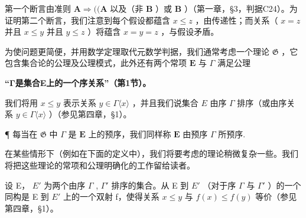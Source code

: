 第一个断言由准则 \(\mathbf{A} \Longrightarrow ((\mathbf{A}\) 以及（非 \(\mathbf{B}\) ）或 \(\mathbf{B}\) ）（第一章，§3，判据C24）。为证明第二个断言，我们注意到每个假设都蕴含 \(x \leqslant z\) ，由传递性；而关系（ \(x = z\) 并且 \(x \leqslant y\) 并且 \(y \leqslant z\) ）将蕴含 \(x = y = z\) ，与假设矛盾。

为使问题更简便，并用数学定理取代元数学判据，我们通常考虑一个理论 \(\mathfrak{G}\) ，它包含集合论的公理及公理模式，此外还有两个常项 \(\mathbf{E}\) 与 \(\Gamma\) 满足公理

\textbf{“Γ是集合E上的一个序关系”（第1节）。}

我们将用 \(x \leqslant y\) 表示关系 \(y \in \Gamma \langle x \rangle\) ，并且我们说集合 \(E\) 由序 \(\Gamma\) 排序（或由序关系 \(y \in \Gamma \langle x \rangle\) ）（参见第四章，§1）。

¶ 每当在 \(\mathfrak{G}\) 中 \(\Gamma\) 是 \(\mathbf{E}\) 上的预序，我们同样称 \(\mathbf{E}\) 由预序 \(\Gamma\) 所预序.

在某些情形下（例如在下面的定义中），我们将要考虑的理论稍微复杂一些。我们将把这些理论的常项和公理明确化的工作留给读者。

设 E， \(E'\) 为两个由序 \(\Gamma\) , \(\Gamma'\) 排序的集合。从 E 到 \(E'\) （对于序 \(\Gamma\) 与 \(\Gamma'\) ）的一个同构是 E 到 \(E'\) 上的一个双射 f，使得关系 \(x \leqslant y\) 与 \(f(x) \leqslant f(y)\) 等价（参见第四章，§1）。

